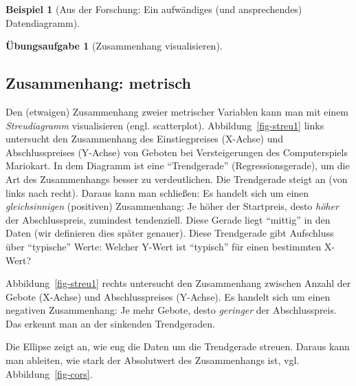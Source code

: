 \documentclass[
  a4paper,
]{scrbook}
\theoremstyle{definition}
\newtheorem{example}{Beispiel}[chapter]
\theoremstyle{definition}
\theoremstyle{definition}
\newtheorem{exercise}{Übungsaufgabe}[chapter]
\theoremstyle{remark}
\begin{document}
\begin{example}[Aus der Forschung: Ein aufwändiges (und ansprechendes)
Datendiagramm]
\begin{exercise}[Zusammenhang
visualisieren]
\end{exercise}

\subsection{Zusammenhang: metrisch}\label{sec-zshg-metr}

Den (etwaigen) Zusammenhang zweier metrischer Variablen kann man mit
einem \emph{Streudiagramm} visualisieren (engl. scatterplot).
Abbildung~\ref{fig-streu1} links untersucht den Zusammenhang des
Einstiegpreises (X-Achse) und Abschlusspreises (Y-Achse) von Geboten bei
Versteigerungen des Computerspiels Mariokart. In dem Diagramm ist eine
``Trendgerade'' (Regressionsgerade), um die Art des Zusammenhangs besser
zu verdeutlichen. Die Trendgerade steigt an (von links nach recht).
Daraus kann man schließen: Es handelt sich um einen
\emph{gleichsinnigen} (positiven) Zusammenhang: Je höher der Startpreis,
desto \emph{höher} der Abschlusspreis, zumindest tendenziell. Diese
Gerade liegt ``mittig'' in den Daten (wir definieren dies später
genauer). Diese Trendgerade gibt Aufschluss über ``typische'' Werte:
Welcher Y-Wert ist ``typisch'' für einen bestimmten X-Wert?

Abbildung~\ref{fig-streu1} rechts untersucht den Zusammenhang zwischen
Anzahl der Gebote (X-Achse) und Abschlusspreises (Y-Achse). Es handelt
sich um einen negativen Zusammenhang: Je mehr Gebote, desto
\emph{geringer} der Abschlusspreis. Das erkennt man an der sinkenden
Trendgeraden.

Die Ellipse zeigt an, wie eng die Daten um die Trendgerade streuen.
Daraus kann man ableiten, wie stark der Absolutwert des Zusammenhangs
ist, vgl. Abbildung~\ref{fig-cors}.

\begin{figure}

\begin{minipage}{0.50\linewidth}

\end{minipage}
\end{figure}
\end{example}
\end{document}
